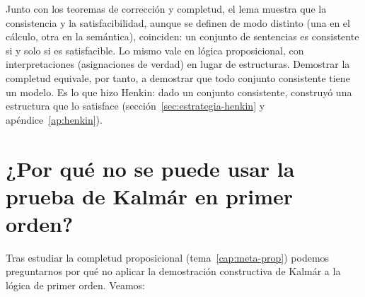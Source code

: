 Junto con los teoremas de corrección y completud, el lema muestra que la consistencia y la satisfacibilidad, aunque se definen de modo distinto (una en el cálculo, otra en la semántica), coinciden: un conjunto de sentencias es consistente si y solo si es satisfacible. Lo mismo vale en lógica proposicional, con interpretaciones (asignaciones de verdad) en lugar de estructuras. Demostrar la completud equivale, por tanto, a demostrar que todo conjunto consistente tiene un modelo. Es lo que hizo Henkin: dado un conjunto consistente, construyó una estructura que lo satisface (sección~\ref{sec:estrategia-henkin} y apéndice~\ref{ap:henkin}).

\section{¿Por qué no se puede usar la prueba de Kalmár en primer orden?\ampliacion}\label{sec:no-kalmar}

Tras estudiar la completud proposicional (tema~\ref{cap:meta-prop}) podemos preguntarnos
por qué no aplicar la demostración constructiva de Kalmár a la lógica
de primer orden. Veamos: 

